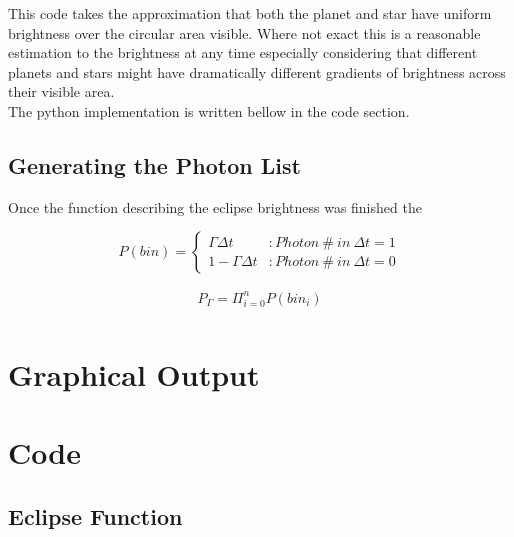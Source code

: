 \documentclass[aps,letterpaper,10pt]{revtex4}
\begin{document}
This code takes the approximation that both the planet and star have uniform brightness over the circular area visible. Where not exact this is a reasonable estimation to the brightness at any time especially considering that different planets and stars might have dramatically different gradients of brightness across their visible area.\\

The python implementation is written bellow in the code section.

\vspace{3mm}

\subsection{Generating the Photon List}
Once the function describing the eclipse brightness was finished the 



\begin{displaymath}
   P(bin) = \left\{
     \begin{array}{lr}
       \Gamma \Delta t & : Photon\ \#\ in\ \Delta t = 1\\
       1-\Gamma \Delta t & : Photon\ \#\ in\ \Delta t = 0
     \end{array}
   \right.
\end{displaymath}

\begin{gather*}
	P_\Gamma = \Pi_{i = 0}^{n} P(bin_i)\\
\end{gather*}

\vspace{3mm} 

\section{Graphical Output}

\begin{figure}[h!]
\vspace{3mm}
\end{figure}


\section{Code}
\subsection{Eclipse Function}
\end{document}
